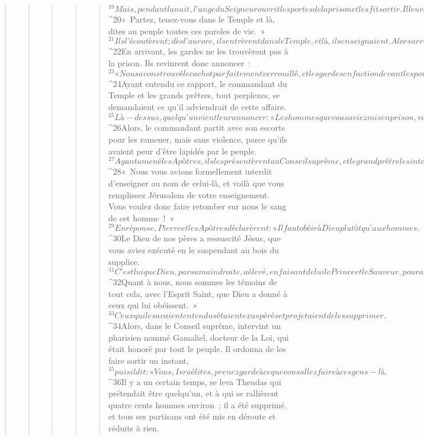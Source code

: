 \begin{verse}
\begin{verse}
\begin{verse}
\begin{verse}
\begin{verse}
${}^{19}Mais, pendant la nuit, l’ange du Seigneur ouvrit les portes de la prison et les fit sortir. Il leur dit : 
${}^{20}« Partez, tenez-vous dans le Temple et là, dites au peuple toutes ces paroles de vie. » 
${}^{21}Ils l’écoutèrent ; dès l’aurore, ils entrèrent dans le Temple, et là, ils enseignaient.
      Alors arriva le grand prêtre, ainsi que son entourage. Ils convoquèrent le Conseil suprême, toute l’assemblée des anciens d’Israël, et ils envoyèrent chercher les Apôtres dans leur cachot. 
${}^{22}En arrivant, les gardes ne les trouvèrent pas à la prison. Ils revinrent donc annoncer : 
${}^{23}« Nous avons trouvé le cachot parfaitement verrouillé, et les gardes en faction devant les portes ; mais, quand nous avons ouvert, nous n’avons trouvé personne à l’intérieur. » 
${}^{24}Ayant entendu ce rapport, le commandant du Temple et les grands prêtres, tout perplexes, se demandaient ce qu’il adviendrait de cette affaire. 
${}^{25}Là-dessus, quelqu’un vient leur annoncer : « Les hommes que vous aviez mis en prison, voilà qu’ils se tiennent dans le Temple et enseignent le peuple ! » 
${}^{26}Alors, le commandant partit avec son escorte pour les ramener, mais sans violence, parce qu’ils avaient peur d’être lapidés par le peuple.
${}^{27}Ayant amené les Apôtres, ils les présentèrent au Conseil suprême, et le grand prêtre les interrogea : 
${}^{28}« Nous vous avions formellement interdit d’enseigner au nom de celui-là, et voilà que vous remplissez Jérusalem de votre enseignement. Vous voulez donc faire retomber sur nous le sang de cet homme ! »
${}^{29}En réponse, Pierre et les Apôtres déclarèrent : « Il faut obéir à Dieu plutôt qu’aux hommes. 
${}^{30}Le Dieu de nos pères a ressuscité Jésus, que vous aviez exécuté en le suspendant au bois du supplice. 
${}^{31}C’est lui que Dieu, par sa main droite, a élevé, en faisant de lui le Prince et le Sauveur, pour accorder à Israël la conversion et le pardon des péchés. 
${}^{32}Quant à nous, nous sommes les témoins de tout cela, avec l’Esprit Saint, que Dieu a donné à ceux qui lui obéissent. »
${}^{33}Ceux qui les avaient entendus étaient exaspérés et projetaient de les supprimer. 
${}^{34}Alors, dans le Conseil suprême, intervint un pharisien nommé Gamaliel, docteur de la Loi, qui était honoré par tout le peuple. Il ordonna de les faire sortir un instant, 
${}^{35}puis il dit : « Vous, Israélites, prenez garde à ce que vous allez faire à ces gens-là. 
${}^{36}Il y a un certain temps, se leva Theudas qui prétendait être quelqu’un, et à qui se rallièrent quatre cents hommes environ ; il a été supprimé, et tous ses partisans ont été mis en déroute et réduits à rien. 

\end{verse}
\end{verse}
\end{verse}
\end{verse}
\end{verse}
